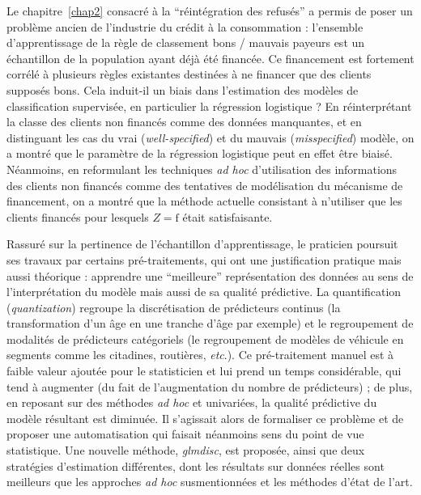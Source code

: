 \medskip

Le chapitre~\ref{chap2} consacré à la ``réintégration des refusés'' a permis de poser un problème ancien de l'industrie du crédit à la consommation : l'ensemble d'apprentissage de la règle de classement bons / mauvais payeurs est un échantillon de la population ayant déjà été financée. Ce financement est fortement corrélé à plusieurs règles existantes destinées à ne financer que des clients supposés bons. Cela induit-il un biais dans l'estimation des modèles de classification supervisée, en particulier la régression logistique ? En réinterprétant la classe des clients non financés comme des données manquantes, et en distinguant les cas du vrai (\textit{well-specified}) et du mauvais (\textit{misspecified}) modèle, on a montré que le paramètre de la régression logistique peut en effet être biaisé. Néanmoins, en reformulant les techniques \textit{ad hoc} d'utilisation des informations des clients non financés comme des tentatives de modélisation du mécanisme de financement, on a montré que la méthode actuelle consistant à n'utiliser que les clients financés pour lesquels $Z = \text{f}$ était satisfaisante.

\medskip

Rassuré sur la pertinence de l'échantillon d'apprentissage, le praticien poursuit ses travaux par certains pré-traitements, qui ont une justification pratique mais aussi théorique : apprendre une ``meilleure'' représentation des données au sens de l'interprétation du modèle mais aussi de sa qualité prédictive. La quantification (\textit{quantization}) regroupe la discrétisation de prédicteurs continus (la transformation d'un âge en une tranche d'âge par exemple) et le regroupement de modalités de prédicteurs catégoriels (le regroupement de modèles de véhicule en segments comme les citadines, routières, \textit{etc}.). Ce pré-traitement manuel est à faible valeur ajoutée pour le statisticien et lui prend un temps considérable, qui tend à augmenter (du fait de l'augmentation du nombre de prédicteurs) ; de plus, en reposant sur des méthodes \textit{ad hoc} et univariées, la qualité prédictive du modèle résultant est diminuée. Il s'agissait alors de formaliser ce problème et de proposer une automatisation qui faisait néanmoins sens du point de vue statistique. Une nouvelle méthode, \textit{glmdisc}, est proposée, ainsi que deux stratégies d'estimation différentes, dont les résultats sur données réelles sont meilleurs que les approches \textit{ad hoc} susmentionnées et les méthodes d'état de l'art.

